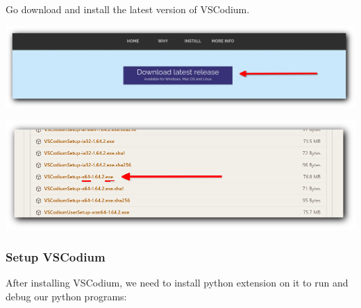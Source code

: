 \documentclass[12pt,a4paper]{article}
\begin{document}
Go download and install the latest version of VSCodium.

\begin{center}
	\includegraphics[width=.9\textwidth]{shots/installation/vscodium-download.png}
\end{center}

\begin{center}
	\includegraphics[width=.9\textwidth]{shots/installation/vscodium-version.png}
\end{center}
\subsubsection{Setup VSCodium}
After installing VSCodium, we need to install python extension on it
to run and debug our python programs:
\end{document}
